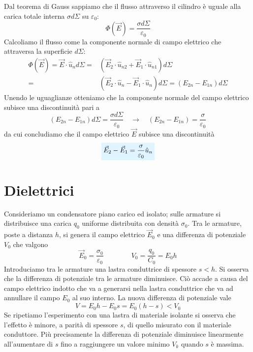 \documentclass[x11names]{report}
\begin{document}
Dal teorema di Gauss sappiamo che il flusso attraverso il cilindro è uguale alla carica totale interna
\(\sigma d\Sigma\) su \(\varepsilon_0\):
\[
\Phi(\vec{E}) = \frac{\sigma d\Sigma}{\varepsilon_0}
\]
Calcoliamo il flusso come la componente normale di campo elettrico che attraversa la superficie \(d\Sigma\):
\begin{align*}
	\Phi(\vec{E}) = \vec{E}\cdot \hat{u}_n  d\Sigma =& \left(\vec{E}_2\cdot\hat{u}_{n2} + \vec{E}_1\cdot\hat{u}_{n1} \right) d\Sigma\\ =& \left(\vec{E}_2\cdot\hat{u}_{n} - \vec{E}_1\cdot\hat{u}_{n} \right) d\Sigma = \left(E_{2n} - E_{1n}\right)d\Sigma
\end{align*}
Unendo le uguaglianze otteniamo che la componente normale del campo elettrico subisce una discontinuità pari a 
\[
\left(E_{2n} - E_{1n}\right)d\Sigma = \frac{\sigma d\Sigma}{\varepsilon_0} \quad \to \quad \left(E_{2n} - E_{1n}\right) = \frac{\sigma}{\varepsilon_0}
\]
da cui concludiamo che il campo elettrico \(\vec{E}\) subisce una discontinuità 
\begin{equation}
 	\viola{\vec{E}_{2} - \vec{E}_{1} = \frac{\sigma}{\varepsilon_0}\hat{u}_n}
\end{equation}


\section{Dielettrici}
Consideriamo un condensatore piano carico ed isolato; sulle armature si distribuisce una carica \(q_0\) uniforme distribuita con densità \(\sigma_0\). Tra le armature, poste a distanza \(h\), si genera il campo elettrico \(\vec{E}_0\) e una differenza di potenziale \(V_0\) che valgono
\[
\vec{E}_0 = \frac{\sigma_0}{\varepsilon_0} \qquad\qquad V_0 = \frac{q_0}{C_0} = E_0 h
\]
Introduciamo tra le armature una lastra conduttrice di spessore \(s < h\). Si osserva che la differenza di potenziale tra le armature diminuisce. Ciò accade a causa del campo elettrico indotto che va a generarsi nella lastra conduttrice che va ad annullare il campo \(E_0\) al suo interno. La nuova differenza di potenziale vale
\[
V = E_0h - E_0 s = E_0(h-s) < V_0
\]
Se ripetiamo l'esperimento con una lastra di materiale isolante si osserva che l'effetto è minore, a parità di spessore \(s\), di quello misurato con il materiale conduttore. Più precisamente la differenza di potenziale diminuisce linearmente all'aumentare di \(s\) fino a raggiungere un valore minimo \(V_k\) quando \(s\) è massima.
\end{document}
